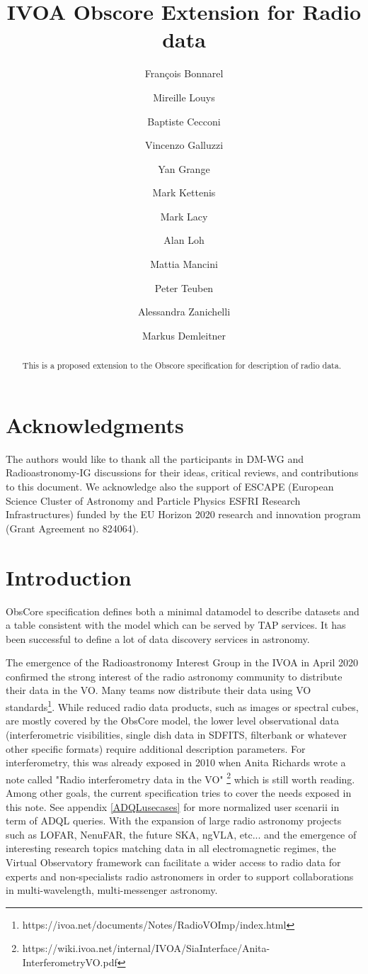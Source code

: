 \documentclass[11pt,a4paper]{ivoa}
\title{IVOA Obscore Extension for Radio data}
\author{Fran\c cois Bonnarel}
\author{Mireille Louys}
\author{Baptiste Cecconi}
\author{Vincenzo Galluzzi}
\author{Yan Grange}
\author{Mark Kettenis}
\author{Mark Lacy}
\author{Alan Loh}
\author{Mattia Mancini}
\author{Peter Teuben}
\author{Alessandra Zanichelli}
\author{Markus Demleitner}
\begin{document}
\begin{abstract}
This is a proposed extension to the Obscore specification for description of radio data.
\end{abstract}

\section*{Acknowledgments}

The authors would like to thank all the participants in DM-WG and Radioastronomy-IG discussions
for their ideas, critical reviews, and contributions to this document.
We acknowledge also the support of  ESCAPE (European Science Cluster of Astronomy
and Particle Physics ESFRI Research Infrastructures) funded by the EU Horizon
2020 research and innovation program (Grant Agreement no 824064).

\section{Introduction}


ObsCore specification \citep{2017ivoa.spec.0509L} defines both a minimal datamodel to describe datasets
and a table consistent with the model which can be served by TAP services. It has been successful
to define a lot of data discovery services in astronomy.

The emergence  of  the Radioastronomy Interest Group in the IVOA in April 2020 confirmed the strong
interest of the radio astronomy community to distribute their data in the VO. Many teams now
distribute their data using VO standards\footnote{https://ivoa.net/documents/Notes/RadioVOImp/index.html}.
While reduced radio data products, such as images or spectral cubes,%
are mostly covered by the ObsCore model, the lower level observational data
(interferometric visibilities, single dish data in SDFITS, filterbank or whatever other specific formats) require additional description parameters. For interferometry, this was already exposed
in 2010 when Anita Richards wrote a note called "Radio interferometry data in the VO"
\footnote{https://wiki.ivoa.net/internal/IVOA/SiaInterface/Anita-InterferometryVO.pdf} which is
still worth reading. Among other goals, the current specification tries to cover the needs exposed in this note. See appendix \ref{ADQLusecases} for more normalized user scenarii in term of ADQL queries.
With the expansion of large radio astronomy projects such as LOFAR, NenuFAR, the future SKA, ngVLA, etc...
and the emergence of interesting research topics matching data in all electromagnetic regimes, the
Virtual Observatory framework can facilitate a wider access to radio data for experts and
non-specialists radio astronomers in order to support collaborations in multi-wavelength,
multi-messenger astronomy.
\end{document}
